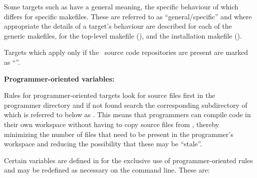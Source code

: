 Some targets such as  have a general meaning, the specific
behaviour of which differs for specific makefiles.  These are referred to as
``general/specific'' and where appropriate the details of a target's behaviour
are described for each of the generic makefiles, for the top-level makefile
(), and the installation makefile ().

Targets which apply only if the \rcs\ source code repositories are present
are marked as ``\rcs''.

\textbf{Programmer-oriented variables:}

Rules for programmer-oriented targets look for source files first in the
programmer directory and if not found search the corresponding subdirectory of
 which is referred to below as .  This means
that programmers can compile code in their own workspace without having to
copy source files from , thereby minimizing the number of
files that need to be present in the programmer's workspace and reducing the
possibility that these may be ``stale''.

Certain variables are defined in  for the exclusive use of
programmer-oriented rules and may be redefined as necessary on the
 command line.  These are:

